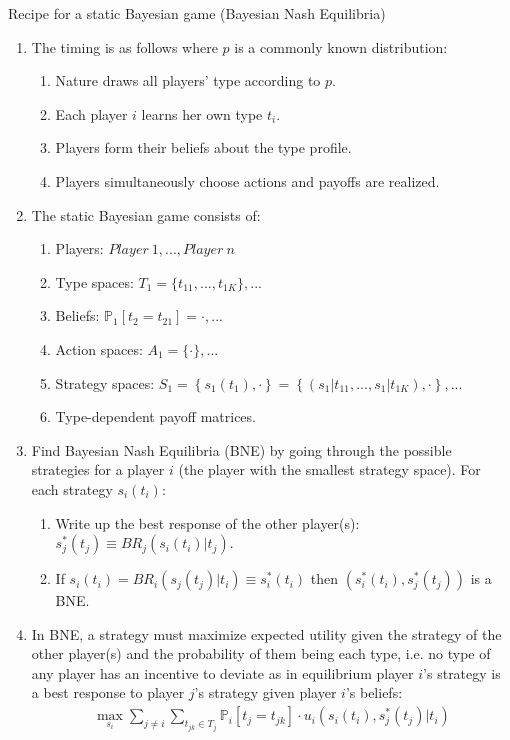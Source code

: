 \begin{frame}{Recipe for a static Bayesian game (Bayesian Nash Equilibria)}
    \begin{enumerate}
      \item The timing is as follows where $p$ is a commonly known distribution:
      \begin{enumerate}\normalsize
        \item Nature draws all players' type according to $p$.
        \item Each player $i$ learns her own type $t_{i}$.
        \item Players form their beliefs about the type profile.
        \item Players simultaneously choose actions and payoffs are realized.
      \end{enumerate}
      \item The static Bayesian game consists of:
      \begin{enumerate}\normalsize
        \item Players: $Player\ 1,...,Player\ n$
        \item Type spaces: $T_1=\{t_{11},...,t_{1K}\},...$
        \item Beliefs: $\mathbb{P}_1[t_2=t_{21}]=\cdot,...$
        \item Action spaces: $A_1=\{\cdot\},...$
        \item Strategy spaces: $S_1=\left\{s_1(t_1),\cdot\right\}=\left\{(s_1|t_{11},...,s_1|t_{1K}),\cdot\right\},...$
        \item Type-dependent payoff matrices.
      \end{enumerate}
      \item Find Bayesian Nash Equilibria (BNE) by going through the possible strategies for a player $i$ (the player with the smallest strategy space). For each strategy $s_i(t_i)$:
      \begin{enumerate}\normalsize
        \item Write up the best response of the other player(s): $s_j^*(t_j)\equiv BR_j\left(s_i(t_i)|t_j\right)$.
        \item If $s_i(t_i)=BR_i\left(s_j(t_j)|t_i\right)\equiv s_i^*(t_i)$ then $\left(s_i^*(t_i),s_j^*(t_j)\right)$ is a BNE.
      \end{enumerate}
      \item In BNE, a strategy must maximize expected utility given the strategy of the other player(s) and the probability of them being each type, i.e. no type of any player has an incentive to deviate as in equilibrium player $i$'s strategy is a best response to player $j$'s strategy given player $i$'s beliefs:
      \begin{align*}
        \max\limits_{s_i}\sum\limits_{j\neq i}\sum\limits_{t_{jk}\in T_j}\mathbb{P}_i[t_j=t_{jk}]\cdot u_i\left(s_i(t_i),s_j^*(t_j)|t_i\right)
      \end{align*}
    \end{enumerate}
    \vfill\null
\end{frame}




